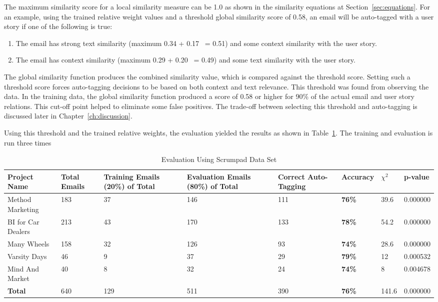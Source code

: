 The maximum similarity score for a local similarity measure can be 1.0 as shown in the similarity equations at Section~\ref{sec:equations}. For an example, using the trained relative weight values and a threshold global similarity score of 0.58, an email will be auto-tagged with a user story if one of the following is true:
\begin{enumerate}
	\item The email has strong text similarity (maximum 0.34 + 0.17 ~= 0.51) and some context similarity with the user story.
	\item The email has context similarity (maximum 0.29 + 0.20 ~= 0.49) and some text similarity with the user story.
\end{enumerate}
The global similarity function produces the combined similarity value, which is compared against the threshold score. Setting such a threshold score forces auto-tagging decisions to be based on both context and text relevance. This threshold was found from observing the data. In the training data, the global similarity function produced a score of 0.58 or higher for 90\% of the actual email and user story relations. This cut-off point helped to eliminate some false positives. The trade-off between selecting this threshold and auto-tagging is discussed later in Chapter~\ref{ch:discussion}.  

Using this threshold and the trained relative weights, the evaluation yielded the results as shown in Table~\ref{tab:sp_evaluation}. The training and evaluation is run three times 

\begin{table}[h!]
  \centering
  \caption{Evaluation Using Scrumpad Data Set}
	\label{tab:sp_evaluation}
    \begin{tabular}{|p{1.7cm}|p{1.4cm}|p{2cm}|p{2cm}|p{1.7cm}|p{1.7cm}|p{1cm}|p{1.5cm}|}
      \hline
      \textbf{Project Name} & \textbf{Total Emails} & \textbf{Training Emails (20\%) of Total} & \textbf{Evaluation Emails (80\%)  of Total} & \textbf{Correct Auto-Tagging} & \textbf{Accuracy} & $\chi^{2}$ & p-value\\
      \hline
      Method Marketing & 183 		& 37	& 146	&	111 & \textbf{76\%}	& 39.6	& 0.000000\\
      \hline
      BI for Car Dealers & 213 	& 43	& 170	&	133	& \textbf{78\%}	& 54.2	& 0.000000\\
      \hline
      Many Wheels & 158 				& 32	& 126	& 93	& \textbf{74\%}	& 28.6 	& 0.000000\\
      \hline
      Varsity Days & 46 				& 9		&	37	& 29	& \textbf{79\%}	& 12		& 0.000532\\
      \hline
      Mind And Market & 40 			& 8		& 32	&	24	& \textbf{74\%}	& 8			& 0.004678\\
      \hline
      \textbf{Total} & 640 			& 129	& 511	&	390	& \textbf{76\%}	& 141.6 & 0.000000\\
      \hline
    \end{tabular}
\end{table}

